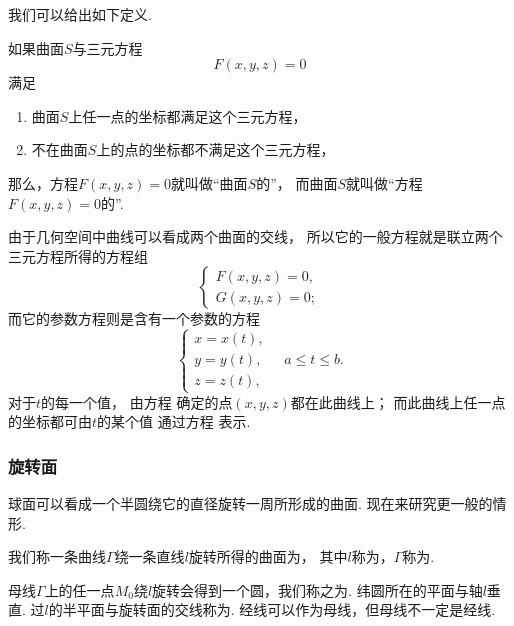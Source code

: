 我们可以给出如下定义.
\begin{definition}
如果曲面\(S\)与三元方程\[
	F(x,y,z)=0
\]满足
\begin{enumerate}
	\item 曲面\(S\)上任一点的坐标都满足这个三元方程，
	\item 不在曲面\(S\)上的点的坐标都不满足这个三元方程，
\end{enumerate}
那么，方程\(F(x,y,z)=0\)就叫做“曲面\(S\)的”，
而曲面\(S\)就叫做“方程\(F(x,y,z)=0\)的”.
\end{definition}

由于几何空间中曲线可以看成两个曲面的交线，
所以它的一般方程就是联立两个三元方程所得的方程组\[
	\left\{ \begin{array}{l}
		F(x,y,z) = 0, \\
		G(x,y,z) = 0;
	\end{array} \right.
\]
而它的参数方程则是含有一个参数的方程
\begin{equation}\label{equation:解析几何.曲线的参数方程}
	\left\{ \begin{array}{l}
		x = x(t), \\
		y = y(t), \\
		z = z(t),
	\end{array} \right.
	\quad
	a \leqslant t \leqslant b.
\end{equation}
对于\(t\)的每一个值，
由方程  确定的点\((x,y,z)\)都在此曲线上；
而此曲线上任一点的坐标都可由\(t\)的某个值
通过方程  表示.

\subsubsection{旋转面}
球面可以看成一个半圆绕它的直径旋转一周所形成的曲面.
现在来研究更一般的情形.

我们称一条曲线\(\Gamma\)绕一条直线\(l\)旋转所得的曲面为，
其中\(l\)称为，\(\Gamma\)称为.

母线\(\Gamma\)上的任一点\(M_0\)绕\(l\)旋转会得到一个圆，我们称之为.
纬圆所在的平面与轴\(l\)垂直.
过\(l\)的半平面与旋转面的交线称为.
经线可以作为母线，但母线不一定是经线.

